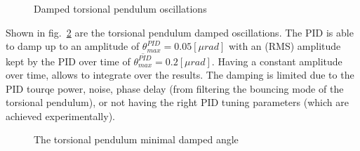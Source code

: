 \documentclass[\main/master.tex]{subfiles}
\begin{document}
\begin{figure}[htbp]
	\centering
	\caption[Damped torsional pendulum oscillations]{Damped torsional pendulum oscillations}
	\label{fig:measured oscillation angle}
\end{figure}
\par\noindent
Shown in fig.~\ref{fig:measured oscillation angle 1} are the torsional pendulum damped oscillations. The PID is able to damp up to an amplitude of $\theta_{max}^{PID}= 0.05[\mu rad]$ with an (RMS) amplitude kept by the PID over time of $\overline{\theta_{max}^{PID}} = 0.2 [\mu rad]$. Having a constant amplitude over time, allows to integrate over the results. The damping is limited due to the PID tourqe power, noise, phase delay (from filtering the bouncing mode of the torsional pendulum), or not having the right PID tuning parameters (which are achieved experimentally).
\begin{figure}[htbp]
	\centering
	\caption[The torsional pendulum minimal damped angle]{The torsional pendulum minimal damped angle}
	\label{fig:measured oscillation angle 1}
\end{figure}
\FloatBarrier
\end{document}
